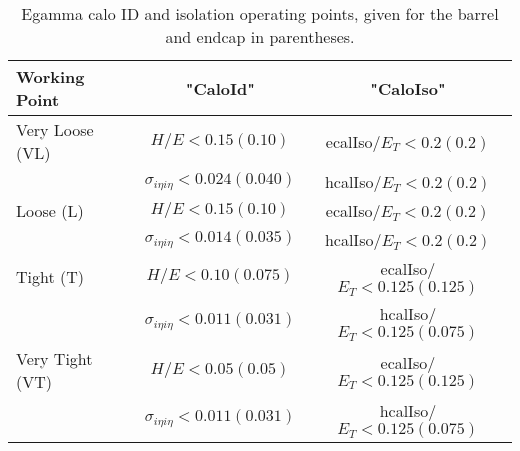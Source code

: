 \begin{table}
\begin{center}
\begin{tabular}{|lcc|}\hline
Working Point & "CaloId" & "CaloIso" \\ \hline \hline
Very Loose (VL) &  $H/E < 0.15 (0.10)$  & ecalIso/$E_T < 0.2 (0.2)$  \\
                &  $\sigma_{i\eta i\eta} < 0.024 (0.040) $ & hcalIso/$E_T < 0.2 (0.2) $ \\ \hline
Loose (L)       &  $H/E < 0.15 (0.10)$  & ecalIso/$E_T < 0.2 (0.2) $ \\
                &  $\sigma_{i\eta i\eta} < 0.014 (0.035)$  & hcalIso/$E_T < 0.2 (0.2) $ \\ \hline
Tight (T)       &  $H/E < 0.10 (0.075) $ & ecalIso/$E_T < 0.125 (0.125)$  \\
                &  $\sigma_{i\eta i\eta} < 0.011 (0.031) $ & hcalIso/$E_T < 0.125 (0.075) $ \\ \hline
Very Tight (VT) &  $H/E < 0.05 (0.05)$  & ecalIso/$E_T < 0.125 (0.125) $  \\
                &  $\sigma_{i\eta i\eta} < 0.011 (0.031) $ & hcalIso/$E_T < 0.125 (0.075) $  \\ \hline 
\end{tabular}
\end{center}
\caption{Egamma calo ID and isolation operating points, given for the barrel and endcap in parentheses.}
\label{tab:workingpoints}
\end{table}


